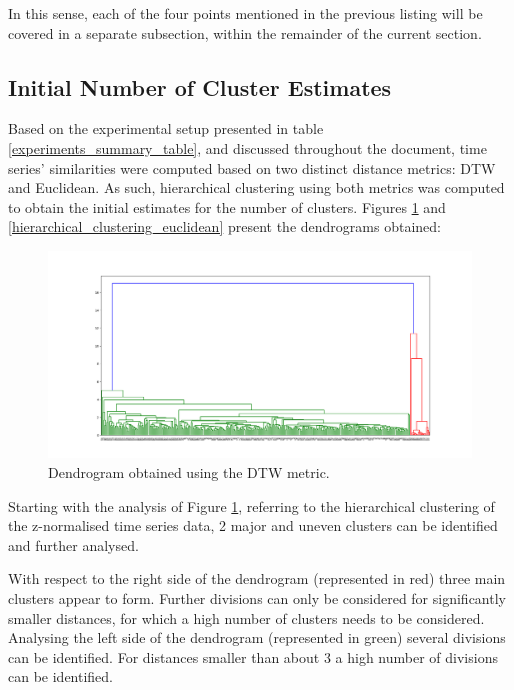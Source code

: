 \documentclass[9pt,journal,compsoc]{IEEEtran}
\begin{document}
In this sense, each of the four points mentioned in the previous listing will be covered in a separate subsection, within the remainder of the current section.

\subsection{Initial Number of Cluster Estimates}
\label{initial_number_clusters}

Based on the experimental setup presented in table \ref{experiments_summary_table}, and discussed throughout the document, time series' similarities were computed based on two distinct distance metrics: DTW and Euclidean. As such, hierarchical clustering using both metrics was computed to obtain the initial estimates for the number of clusters. Figures \ref{hierarchical_clustering_dtw} and \ref{hierarchical_clustering_euclidean} present the dendrograms obtained:

\begin{figure}[ht]
	\centering
	\includegraphics[scale=0.2]{images/Hierarchical_Clustering_DTW.png}
	\caption{Dendrogram obtained using the DTW metric.}
	\label{hierarchical_clustering_dtw}
\end{figure}

Starting with the analysis of Figure \ref{hierarchical_clustering_dtw}, referring to the hierarchical clustering of the z-normalised time series data, 2 major and uneven clusters can be identified and further analysed.

With respect to the right side of the dendrogram (represented in red) three main clusters appear to form. Further divisions can only be considered for significantly smaller distances, for which a high number of clusters needs to be considered. Analysing the left side of the dendrogram (represented in green) several divisions can be identified. For distances smaller than about 3 a high number of divisions can be identified.
\end{document}
